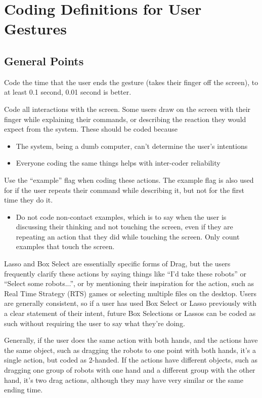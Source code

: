 \chapter{Coding Definitions for User Gestures} \label{chapter:coding_defs}

\section{General Points} \label{section:General_Points}

Code the time that the user ends the gesture (takes their finger off the screen), to at least 0.1 second, 0.01 second is better. 
 
Code all interactions with the screen. Some users draw on the screen with their finger while explaining their commands, or describing the reaction they would expect from the system. These should be coded because 
\begin{itemize}
	\item The system, being a dumb computer, can't determine the user's intentions
	\item Everyone coding the same things helps with inter-coder reliability 
\end{itemize}

Use the ``example'' flag when coding these actions. The example flag is also used for if the user repeats their command while describing it, but not for the first time they do it. 
\begin{itemize}
	\item Do not code non-contact examples, which is to say when the user is discussing their thinking and not touching the screen, even if they are repeating an action that they did while touching the screen. Only count examples that touch the screen. 
\end{itemize}
 
Lasso and Box Select are essentially specific forms of Drag, but the users frequently clarify these actions by saying things like ``I'd take these robots'' or ``Select some robots...'', or by mentioning their inspiration for the action, such as Real Time Strategy (RTS) games or selecting multiple files on the desktop. Users are generally consistent, so if a user has used Box Select or Lasso previously with a clear statement of their intent, future Box Selections or Lassos can be coded as such without requiring the user to say what they're doing. 
 
Generally, if the user does the same action with both hands, and the actions have the same object, such as dragging the robots to one point with both hands, it's a single action, but coded as 2-handed. If the actions have different objects, such as dragging one group of robots with one hand and a different group with the other hand, it's two drag actions, although they may have very similar or the same ending time. 


